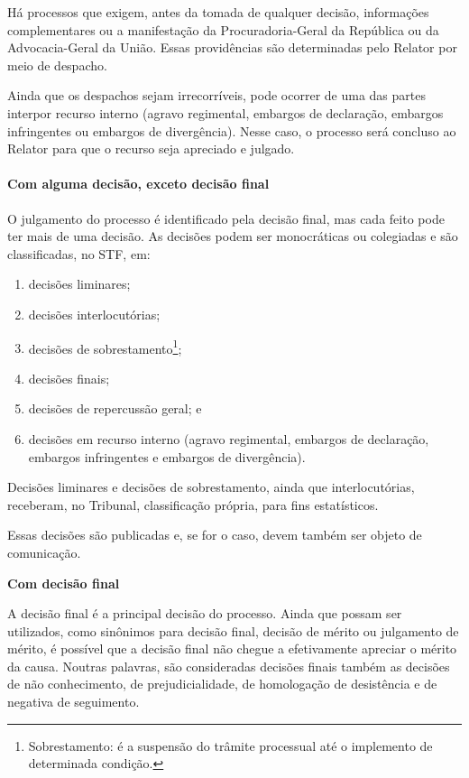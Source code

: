 \documentclass[
]{book}
\providecommand{\tightlist}{%
  \setlength{\itemsep}{0pt}\setlength{\parskip}{0pt}}
\begin{document}
Há processos que exigem, antes da tomada de qualquer decisão, informações complementares ou a manifestação da Procuradoria-Geral da República ou da Advocacia-Geral da União. Essas providências são determinadas pelo Relator por meio de despacho.

Ainda que os despachos sejam irrecorríveis, pode ocorrer de uma das partes interpor recurso interno (agravo regimental, embargos de declaração, embargos infringentes ou embargos de divergência). Nesse caso, o processo será concluso ao Relator para que o recurso seja apreciado e julgado.

\hypertarget{com-alguma-decisuxe3o-exceto-decisuxe3o-final}{%
\paragraph{Com alguma decisão, exceto decisão final}\label{com-alguma-decisuxe3o-exceto-decisuxe3o-final}}

O julgamento do processo é identificado pela decisão final, mas cada feito pode ter mais de uma decisão. As decisões podem ser monocráticas ou colegiadas e são classificadas, no STF, em:

\begin{enumerate}
\def\labelenumi{\arabic{enumi}.}
\tightlist
\item
  decisões liminares;
\item
  decisões interlocutórias;
\item
  decisões de sobrestamento\footnote{Sobrestamento: é a suspensão do trâmite processual até o implemento de determinada condição.};
\item
  decisões finais;
\item
  decisões de repercussão geral; e
\item
  decisões em recurso interno (agravo regimental, embargos de declaração, embargos infringentes e embargos de divergência).
\end{enumerate}

Decisões liminares e decisões de sobrestamento, ainda que interlocutórias, receberam, no Tribunal, classificação própria, para fins estatísticos.

Essas decisões são publicadas e, se for o caso, devem também ser objeto de comunicação.

\textbf{Com decisão final}

A decisão final é a principal decisão do processo. Ainda que possam ser utilizados, como sinônimos para decisão final, decisão de mérito ou julgamento de mérito, é possível que a decisão final não chegue a efetivamente apreciar o mérito da causa. Noutras palavras, são consideradas decisões finais também as decisões de não conhecimento, de prejudicialidade, de homologação de desistência e de negativa de seguimento.
\end{document}
